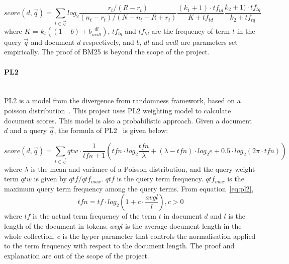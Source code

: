 \begin{equation}\label{eq:BM25}
score(d, \vec{q}) = \sum_{t \in \vec{q}} log_2 \frac{r_t/(R - r_t)}{(n_t - r_t)/(N - n_t - R + r_t)} \frac{(k_1 + 1)\cdot tf_{td}}{K + tf_{td}} \frac{k_2 + 1)\cdot tf_{tq}}{k_2 + tf_{tq}}
\end{equation}
where $K$ = $k_t((1 - b) + b\frac{dl}{avdl})$, $tf_{tq}$ and $tf_{td}$ are the frequency of term $t$ in the query $\vec{q}$ and document $d$ respectively,
and $b$, $dl$ and $avdl$ are parameters set empirically. The proof of BM25 is beyond the scope of the project.

\paragraph{PL2} \hspace{0pt} \\
PL2 is a model from the divergence from randomness framework, based on a poisson distribution~\cite{craig}. This project uses PL2 weighting model to 
calculate document scores. This model is also a probabilistic approach. Given a document $d$ and a query $\vec{q}$, the formula of PL2~\cite[P. 23-24]{craigthesis} is given below:

\begin{equation}\label{eq:pl2}
 score(d, \vec{q}) = \sum_{t \in \vec{q}} qtw\cdot \frac{1}{tfn + 1}(tfn\cdot log_2\frac{tfn}{\lambda} + 
 (\lambda - tfn)\cdot log_2e + 0.5\cdot log_2(2\pi \cdot tfn))
\end{equation}
where $\lambda$ is the mean and variance of a Poisson distribution, and the query weight term $qtw$ is given by $qtf/qtf_{max}$.
$qtf$ is the query term frequency. $qtf_{max}$ is the maximum query term frequency among the query terms. From equation~\ref{eq:pl2}, 
\[tfn = tf\cdot log_2(1 + c\cdot \frac{avgl}{l}), c > 0\]
where $tf$ is the actual term frequency of the term $t$ in document $d$ and $l$ is the length of the
document in tokens. $avgl$ is the average document length in the whole collection.
$c$ is the hyper-parameter that controls the normalisation applied to the term frequency
with respect to the document length.
The proof and explanation are out of the scope of the project.


